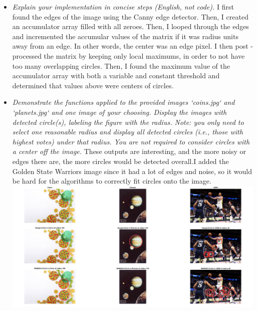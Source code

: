 \documentclass[11pt]{article}
\begin{document}
    \begin{itemize}
        \item \textit{Explain your implementation in concise steps (English, not code).}\newline
        I first found the edges of the image using the Canny edge detector. Then, I created an accumulator
        array filled with all zeroes. Then, I looped through the edges and incremented the accumular values of the
        matrix if it was radius units away from an edge. In other words, the center was an edge pixel. I then post
        -processed the matrix by keeping only local maximums, in order to not have too many overlapping circles. Then, I
        found the maximum value of the accumulator array with both a variable and constant threshold and determined that
        values above were centers of circles.\newline

        \item \textit{Demonstrate the functions applied to the provided images ‘coins.jpg‘ and ‘planets.jpg‘ and one
        image of your choosing. Display the images with detected circle(s), labeling the figure with the radius.
        Note: you only need to select one reasonable radius and display all detected circles
            (i.e., those with highest votes) under that radius.
            You are not required to consider circles with a center off the image.}\newline
        These outputs are interesting, and the more noisy or edges there are, the more circles would be detected
        overall.\newline I added the Golden State Warriors image since it had a lot of edges and noise, so it would
        be hard for the algorithms to correctly fit circles onto the image.\newline
        \includegraphics[width=\textwidth]{Output Pictures/detection_output}\newline


\end{itemize}
\end{document}
